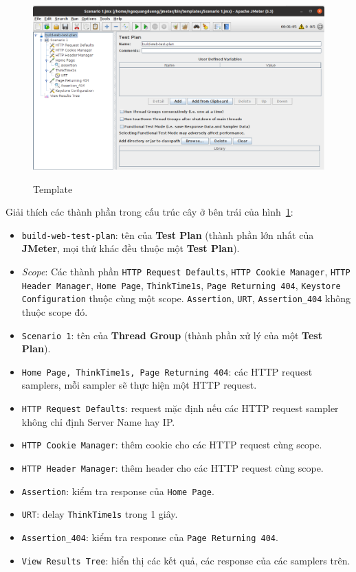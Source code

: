 \documentclass[12pt]{report}
\newcommand{\jmeter}{\textbf{JMeter}}
\begin{document}
\FloatBarrier{}
\begin{figure}[htp]
    \centering
    \includegraphics[scale=0.33]{template.png}
    \caption{Template}
    {\label{fig:template}}
\end{figure}
\FloatBarrier{}

\par Giải thích các thành phần trong cấu trúc cây ở bên trái của hình~\ref{fig:template}:

\begin{itemize}
    \item \texttt{build-web-test-plan}: tên của \textbf{Test Plan} (thành phần lớn nhất của \jmeter{}, mọi thứ khác đều thuộc một \textbf{Test Plan}).
    \item \textit{Scope}: Các thành phần \texttt{HTTP Request Defaults}, \texttt{HTTP Cookie Manager}, \texttt{HTTP Header Manager}, \texttt{Home Page}, \texttt{ThinkTime1s}, \texttt{Page Returning 404}, \texttt{Keystore Configuration} thuộc cùng một scope. \texttt{Assertion}, \texttt{URT}, \texttt{Assertion\_404} không thuộc scope đó.
    \item \texttt{Scenario 1}: tên của \textbf{Thread Group} (thành phần xử lý của một \textbf{Test Plan}).
    \item \texttt{Home Page, ThinkTime1s, Page Returning 404}: các HTTP request samplers, mỗi sampler sẽ thực hiện một HTTP request.
    \item \texttt{HTTP Request Defaults}: request mặc định nếu các HTTP request sampler không chỉ định Server Name hay IP.\@
    \item \texttt{HTTP Cookie Manager}: thêm cookie cho các HTTP request cùng scope.
    \item \texttt{HTTP Header Manager}: thêm header cho các HTTP request cùng scope.
    \item \texttt{Assertion}: kiểm tra response của \texttt{Home Page}.
    \item \texttt{URT}: delay \texttt{ThinkTime1s} trong 1 giây.
    \item \texttt{Assertion\_404}: kiểm tra response của \texttt{Page Returning 404}.
    \item \texttt{View Results Tree}: hiển thị các kết quả, các response của các samplers trên.
\end{itemize}
\end{document}
